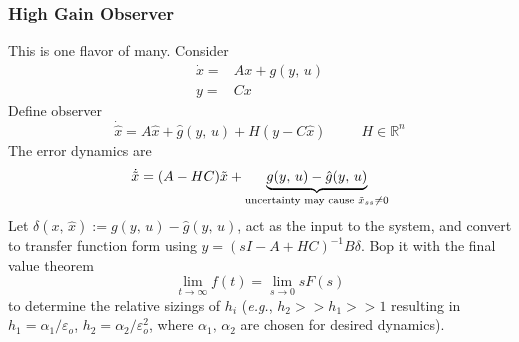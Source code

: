 \documentclass[twocolumn]{article}    %
\begin{document}
\subsubsection*{High Gain Observer}
This is one flavor of many. Consider 
\begin{align*}
    \dot{x} = & Ax + g(y,\,u)\\
    y =& Cx
\end{align*}
Define observer
\begin{equation*}
    \dot{\hat{x}} = A \hat{x} + \hat{g}(y,\,u) + H (y-C\hat{x}) \hspace{30pt} H \in\mathds{R}^n
\end{equation*}
The error dynamics are
\begin{equation*}
    \dot{\Tilde{x}} = (A-HC) \Tilde{x} + \underbrace{g(y,\,u) - \hat{g}(y,\,u)}_{\text{uncertainty may cause } \Tilde{x}_{ss} \neq0}
\end{equation*}
Let \(\delta(x,\,\hat{x}) :=g(y,\,u) - \hat{g}(y,\,u)\), act as the input to the system, and convert to transfer function form using \(y = (sI - A + HC)^{-1}B\delta\). Bop it with the final value theorem
\begin{equation*}
    \lim_{t\to\infty} f(t) = \lim_{s\to 0 } sF(s)
\end{equation*}
to determine the relative sizings of \(h_i\) (\textit{e.g.}, \(h_2 >>h_1 >>1\) resulting in \(h_1 = \alpha_1/\varepsilon_o\), \(h_2 = \alpha_2/\varepsilon^2_o\), where \(\alpha_1,\,\alpha_2\) are chosen for desired dynamics).
\end{document}
